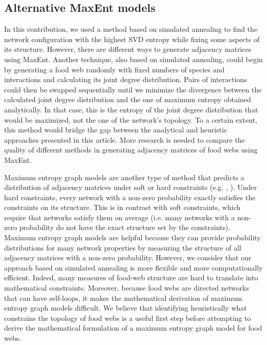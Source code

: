 \subsection{Alternative MaxEnt models}

In this contribution, we used a method based on simulated annealing to find the
network configuration with the highest SVD entropy while fixing some aspects of
its structure. However, there are different ways to generate adjacency matrices
using MaxEnt. Another technique, also based on simulated annealing, could begin
by generating a food web randomly with fixed numbers of species and interactions
and calculating its joint degree distribution. Pairs of interactions could then
be swapped sequentially until we minimize the divergence between the calculated
joint degree distribution and the one of maximum entropy obtained analytically.
In that case, this is the entropy of the joint degree distribution that would be
maximized, not the one of the network's topology. To a certain extent, this
method would bridge the gap between the analytical and heuristic approaches
presented in this article. More research is needed to compare the quality of
different methods in generating adjacency matrices of food webs using MaxEnt.  

Maximum entropy graph models are another type of method that predicts a
distribution of adjacency matrices under soft or hard constraints (e.g.
\cite{Park2004Statistical}, \cite{Cimini2019Statistical}). Under hard
constraints, every network with a non-zero probability exactly satisfies the
constraints on its structure. This is in contrast with soft constraints, which
require that networks satisfy them on average (i.e. many networks with a
non-zero probability do not have the exact structure set by the constraints).
Maximum entropy graph models are helpful because they can provide probability
distributions for many network properties by measuring the structure of all
adjacency matrices with a non-zero probability. However, we consider that our
approach based on simulated annealing is more flexible and more computationally
efficient. Indeed, many measures of food-web structure are hard to translate
into mathematical constraints. Moreover, because food webs are directed networks
that can have self-loops, it makes the mathematical derivation of maximum
entropy graph models difficult. We believe that identifying heuristically what
constrains the topology of food webs is a useful first step before attempting to
derive the mathematical formulation of a maximum entropy graph model for food
webs. 

